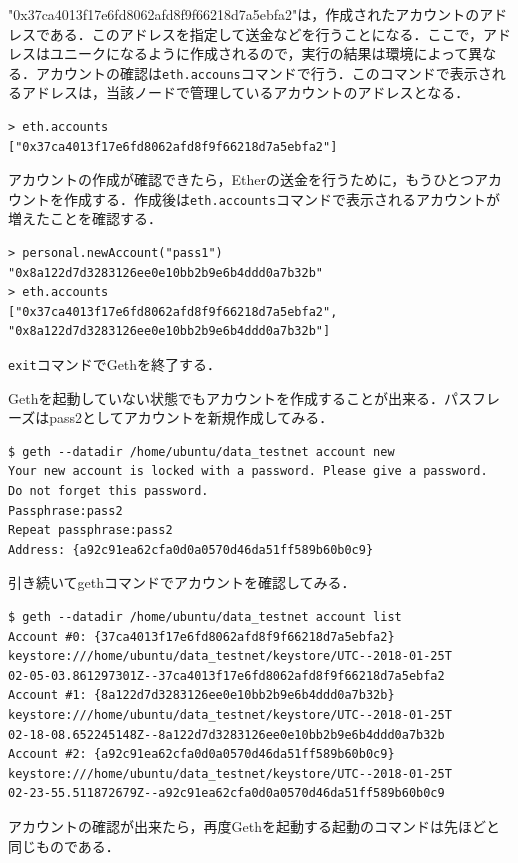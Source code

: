 "0x37ca4013f17e6fd8062afd8f9f66218d7a5ebfa2"は，作成されたアカウントのアドレスである．このアドレスを指定して送金などを行うことになる．ここで，アドレスはユニークになるように作成されるので，実行の結果は環境によって異なる．アカウントの確認は\texttt{eth.accouns}コマンドで行う．このコマンドで表示されるアドレスは，当該ノードで管理しているアカウントのアドレスとなる．
\begin{verbatim}
> eth.accounts
["0x37ca4013f17e6fd8062afd8f9f66218d7a5ebfa2"]
\end{verbatim}

アカウントの作成が確認できたら，Etherの送金を行うために，もうひとつアカウントを作成する．作成後は\texttt{eth.accounts}コマンドで表示されるアカウントが増えたことを確認する．
\begin{verbatim}
> personal.newAccount("pass1")
"0x8a122d7d3283126ee0e10bb2b9e6b4ddd0a7b32b"
> eth.accounts
["0x37ca4013f17e6fd8062afd8f9f66218d7a5ebfa2", 
"0x8a122d7d3283126ee0e10bb2b9e6b4ddd0a7b32b"]
\end{verbatim}

\texttt{exit}コマンドでGethを終了する．

Gethを起動していない状態でもアカウントを作成することが出来る．パスフレーズはpass2としてアカウントを新規作成してみる．
\begin{verbatim}
$ geth --datadir /home/ubuntu/data_testnet account new
Your new account is locked with a password. Please give a password. 
Do not forget this password.
Passphrase:pass2
Repeat passphrase:pass2
Address: {a92c91ea62cfa0d0a0570d46da51ff589b60b0c9}
\end{verbatim}
\newpage
引き続いてgethコマンドでアカウントを確認してみる．
\begin{verbatim}
$ geth --datadir /home/ubuntu/data_testnet account list
Account #0: {37ca4013f17e6fd8062afd8f9f66218d7a5ebfa2} 
keystore:///home/ubuntu/data_testnet/keystore/UTC--2018-01-25T
02-05-03.861297301Z--37ca4013f17e6fd8062afd8f9f66218d7a5ebfa2
Account #1: {8a122d7d3283126ee0e10bb2b9e6b4ddd0a7b32b} 
keystore:///home/ubuntu/data_testnet/keystore/UTC--2018-01-25T
02-18-08.652245148Z--8a122d7d3283126ee0e10bb2b9e6b4ddd0a7b32b
Account #2: {a92c91ea62cfa0d0a0570d46da51ff589b60b0c9}
keystore:///home/ubuntu/data_testnet/keystore/UTC--2018-01-25T
02-23-55.511872679Z--a92c91ea62cfa0d0a0570d46da51ff589b60b0c9
\end{verbatim}

アカウントの確認が出来たら，再度Gethを起動する起動のコマンドは先ほどと同じものである．

